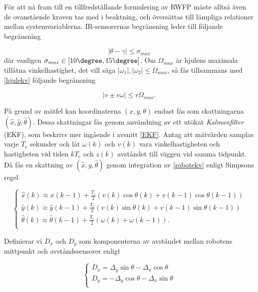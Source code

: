 \documentclass[11pt]{article}
\begin{document}
\begin{flushleft}
För att nå fram till en tillfredställande formulering av RWFP måste alltså även de ovanstående kraven tas med i beaktning, och översättas till lämpliga relationer mellan systemvariablerna. IR-sensorernas begränsning leder till följande begränsning

\begin{equation}\label{IRkrav}
	|\theta - \gamma| \leq \sigma_{max}
\end{equation}
där vanligen \(\sigma_{max} \in [10\degree,15\degree]\). Om $\Omega_{max}$ är hjulens maximala tillåtna vinkelhastighet, det vill säga \(|\omega_1|,|\omega_2| \leq \Omega_{max}\), så fås tillsammans med \eqref{hjulekv} följande begränsning

\begin{equation}\label{hastbegr}
	|v \pm e\omega| \leq r\Omega_{max}.
\end{equation}

På grund av mätfel kan koordinaterna \((x,y,\theta)\) endast fås som skattningarna \((\hat{x},\hat{y},\hat{\theta})\). Dessa skattningar fås genom användning av ett utökat \emph{Kalmanfilter} (EKF), som beskrivs mer ingående i avsnitt \ref{EKF}. Antag att mätvärden samplas varje $T_c$ sekunder och låt $\omega(k)$ och $v(k)$ vara vinkelhastigheten och hastigheten vid tiden $kT_c$ och $z(k)$ avståndet till väggen vid samma tidpunkt. Då fås en skattning av $(\hat{x},\hat{y},\hat{\theta})$ genom integration av \eqref{robotekv} enligt Simpsons regel

\begin{equation}\label{rwfpåterkoppling}
	\begin{cases}
	\hat{x}(k) \approx \hat{x}(k-1) + \frac{T_c}{2} (v(k) \cos \theta(k) + v(k-1)\cos \theta(k-1)) \\
	\hat{y}(k) \approx \hat{y}(k-1) + \frac{T_c}{2} (v(k) \sin \theta(k) + v(k-1)\sin \theta(k-1)) \\
	\hat{\theta}(k) \approx \hat{\theta}(k-1) + \frac{T_c}{2} (\omega(k) + \omega(k-1)). \\
	\end{cases}
\end{equation}

Definierar vi $D_x$ och $D_y$ som komponenterna av avståndet mellan robotens mittpunkt och avståndssensorer enligt

\begin{equation*}
	\begin{cases}
	D_x = \Delta_y \sin \theta - \Delta_x \cos \theta \\
	D_y = -\Delta_y \cos \theta - \Delta_x \sin \theta \\
	\end{cases}
\end{equation*}


\end{flushleft}
\end{document}
